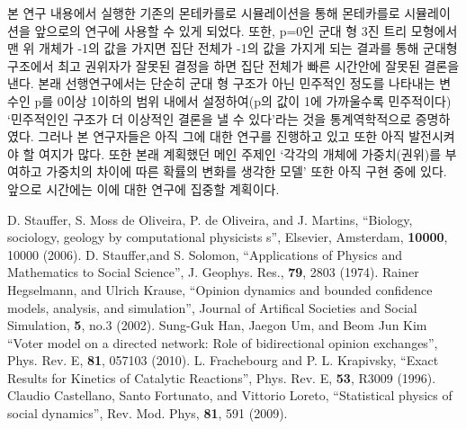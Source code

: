 \documentclass{gshs-report-v1.2}
\begin{document}
본 연구 내용에서 실행한 기존의 몬테카를로 시뮬레이션을 통해 몬테카를로 시뮬레이션을 앞으로의 연구에 사용할 수 있게 되었다. 또한, p=0인 군대 형 3진 트리 모형에서 맨 위 개체가 -1의 값을 가지면 집단 전체가 -1의 값을 가지게 되는 결과를 통해 군대형 구조에서 최고 권위자가 잘못된 결정을 하면 집단 전체가 빠른 시간안에 잘못된 결론을 낸다.
본래 선행연구\cite{Han10}에서는 단순히 군대 형 구조가 아닌 민주적인 정도를 나타내는 변수인 p를 0이상 1이하의 범위 내에서 설정하여(p의 값이 1에 가까울수록 민주적이다) ‘민주적인인 구조가 더 이상적인 결론을 낼 수 있다’라는 것을 통계역학적으로 증명하였다. 그러나 본 연구자들은 아직 그에 대한 연구를 진행하고 있고 또한 아직 발전시켜야 할 여지가 많다. 
또한 본래 계획했던 메인 주제인 ‘각각의 개체에 가중치(권위)를 부여하고 가중치의 차이에 따른 확률의 변화를 생각한 모델’ 또한 아직 구현 중에 있다. 앞으로 시간에는 이에 대한 연구에 집중할 계획이다. 


\begin{thebibliography}{99}

 D. Stauffer, S. Moss de Oliveira, P. de Oliveira, and J. Martins, ``Biology, sociology, geology by computational
physicists s'', Elsevier, Amsterdam, {\bf 10000}, 10000 (2006).
 D. Stauffer,and S. Solomon, ``Applications of Physics and Mathematics to Social Science'', J. Geophys. Res., {\bf 79}, 2803 (1974).
 Rainer Hegselmann, and Ulrich Krause, ``Opinion dynamics and bounded confidence models, analysis, and simulation'', Journal of Artifical Societies and Social Simulation, {\bf 5}, no.3 (2002).
 Sung-Guk Han, Jaegon Um, and Beom Jun Kim ``Voter model on a directed network: Role of bidirectional opinion exchanges'', Phys. Rev. E, {\bf 81}, 057103 (2010).
 L. Frachebourg and P. L. Krapivsky, ``Exact Results for Kinetics of Catalytic Reactions'', Phys. Rev. E, {\bf 53}, R3009 (1996).
 Claudio Castellano, Santo Fortunato, and Vittorio Loreto, ``Statistical physics of social dynamics'', Rev. Mod. Phys, {\bf 81}, 591 (2009).

\end{thebibliography}

%
%
%
%
%
\end{document}
